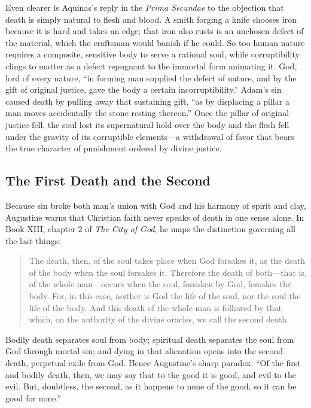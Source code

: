 Even clearer is Aquinas's reply in the \emph{Prima Secundae} to the objection that death is simply natural to flesh and blood. A smith forging a knife chooses iron because it is hard and takes an edge; that iron also rusts is an unchosen defect of the material, which the craftsman would banish if he could. So too human nature requires a composite, sensitive body to serve a rational soul, while corruptibility clings to matter as a defect repugnant to the immortal form animating it. God, lord of every nature, ``in forming man supplied the defect of nature, and by the gift of original justice, gave the body a certain incorruptibility.'' Adam's sin caused death by pulling away that sustaining gift, ``as by displacing a pillar a man moves accidentally the stone resting thereon.'' Once the pillar of original justice fell, the soul lost its supernatural hold over the body and the flesh fell under the gravity of its corruptible elements---a withdrawal of favor that bears the true character of punishment ordered by divine justice.

\subsection{The First Death and the Second}

Because sin broke both man's union with God and his harmony of spirit and clay, Augustine warns that Christian faith never speaks of death in one sense alone. In Book XIII, chapter 2 of \emph{The City of God}, he maps the distinction governing all the last things:

\begin{quote}
The death, then, of the soul takes place when God forsakes it, as the death of the body when the soul forsakes it. Therefore the death of both---that is, of the whole man---occurs when the soul, forsaken by God, forsakes the body. For, in this case, neither is God the life of the soul, nor the soul the life of the body. And this death of the whole man is followed by that which, on the authority of the divine oracles, we call the second death.
\end{quote}

Bodily death separates soul from body; spiritual death separates the soul from God through mortal sin; and dying in that alienation opens into the second death, perpetual exile from God. Hence Augustine's sharp paradox: ``Of the first and bodily death, then, we may say that to the good it is good, and evil to the evil. But, doubtless, the second, as it happens to none of the good, so it can be good for none.''

